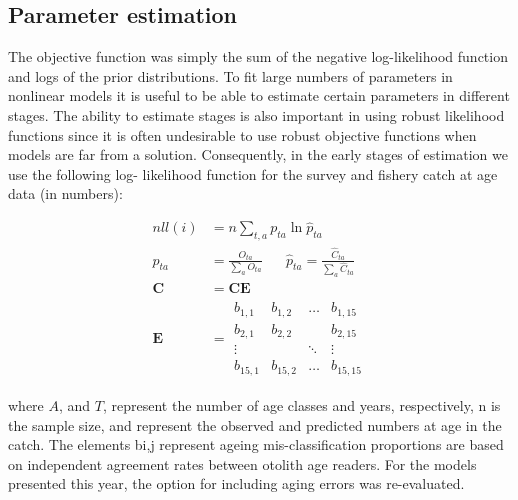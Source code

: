 \documentclass[11pt,
  english,
  a4paper,
]{article}
\begin{document}

\hypertarget{parameter-estimation}{%
\subsection{Parameter estimation}\label{parameter-estimation}}

\leavevmode\tagmcend\tagstructend


The objective function was simply the sum of the negative log-likelihood function and logs of the prior distributions. To fit large numbers of parameters in nonlinear models it is useful to be able to estimate certain parameters in different stages. The ability to estimate stages is also important in using robust likelihood functions since it is often undesirable to use robust objective functions when models are far from a solution. Consequently, in the early stages of estimation we use the following log- likelihood function for the survey and fishery catch at age data (in numbers):

\leavevmode\tagmcend\tagstructend\par


\begin{align}
nll(i) &= n \sum_{t,a}{ p_{ta} \ln \hat p_{ta} } \\
p_{ta} &= \frac{O_{ta}}{\sum_a{O_{ta}}} \hspace{20pt} 
\hat p_{ta} = \frac{\hat C_{ta}}{\sum_a{\hat C_{ta}}} \\
\mathbf{C} &= \mathbf{CE}  \\
\mathbf{E}  &=  \begin{array}{llll} 
b_{1,1} & b_{1,2} & \dots & b_{1,15} \\
b_{2,1} & b_{2,2} &       & b_{2,15} \\
\vdots &         & \ddots &  \vdots \\
b_{15,1} & b_{15,2} & \dots      & b_{15,15} 
\end{array}  
\end{align}

\leavevmode\tagmcend\tagstructend\par


where {\(A\)\leavevmode\tagmcend\tagstructend}, and {\(T\)\leavevmode\tagmcend\tagstructend}, represent the number of age classes and years, respectively, n is the sample size, and represent the observed and predicted numbers at age in the catch. The elements bi,j represent ageing mis-classification proportions are based on independent agreement rates between otolith age readers. For the models presented this year, the option for including aging errors was re-evaluated.
\end{document}
